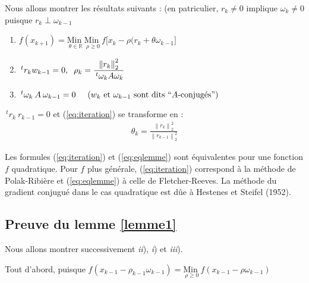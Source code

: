 \documentclass[a4paper,11pt]{article}
\newcommand{\R}{\mathbb{R}}
\newcommand{\norm}[1]{\left\lVert#1\right\rVert}
\newcommand{\tpo}[1]{\,^t#1}
\newcommand{\MinI}[1]{\underset{#1}{\text{Min }}}
\theoremstyle{plain} %
\begin{document}
Nous allons montrer les résultats suivants : (en patriculier, $r_k \neq 0$ implique
$\omega_k \neq 0$ puisque $r_k \perp \omega_{k-1}$


\begin{lemme}
    \begin{enumerate}[label=\textit{\roman*)}]
        \item $f(x_{k+1}) = \MinI{\theta \in \R} \MinI{\rho \geq 0} f \Big[ x_k - \rho(r_k + \theta \omega_{k-1} \Big]$

        \item $\tpo{r_k} w_{k-1} = 0, 
            \hspace{0.2cm} 
            \rho_k = \dfrac{\norm{r_k}^2_2}{\tpo{\omega_k} A \omega_k}$

        \item $\tpo{\omega_k} \: A \: \omega_{k-1} = 0 \hspace{0.5cm} (w_k \text{ et }
            \omega_{k-1} \text{ sont dits ``$A$-conjugés''})$
    \end{enumerate} 

    \label{lemme1}
\end{lemme}

\begin{lemme}
    $\tpo r_k \: r_{k-1} = 0$ et (\ref{eq:iteration}) se transforme en :
    \begin{align}
        \theta_k = \frac{\norm{r_k}_2^2}{\norm{r_{k-1}}_2^2}
        \label{eq:eqlemme}
    \end{align}
    \label{lemme2}
\end{lemme}

\begin{remark}
    Les formules (\ref{eq:iteration}) et (\ref{eq:eqlemme}) sont équivalentes pour
    une fonction $f$ quadratique. Pour $f$ plus générale, (\ref{eq:iteration}) correspond
    à la méthode de Polak-Ribière et (\ref{eq:eqlemme}) à celle de Fletcher-Reeves.
    La méthode du gradient conjugué dans le cas quadratique est dûe à Hestenes et
    Steifel (1952).
\end{remark}

\subsection{Preuve du lemme \ref{lemme1}}
Nous allons montrer successivement \textit{ii}), \textit{i}) et \textit{iii}).

Tout d'abord, puisque $f(x_{k-1} - \rho_{k-1} \omega_{k-1}) = \MinI{\rho \geq 0} f(x_{k-1} - \rho \omega_{k-1})$
\end{document}
